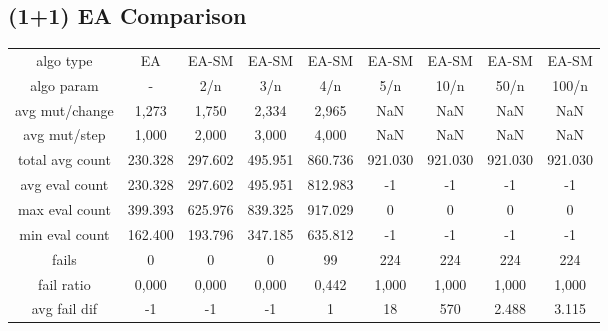 \subsection{(1+1) EA Comparison}

\begin{tabular}[h]{ccccccccc}
algo type&             EA&   EA-SM&   EA-SM&   EA-SM&   EA-SM&   EA-SM&   EA-SM&   EA-SM\\
algo param&             -&     2/n&     3/n&     4/n&     5/n&    10/n&    50/n&   100/n\\
avg mut/change&     1,273&   1,750&   2,334&   2,965&     NaN&     NaN&     NaN&     NaN\\
avg mut/step&       1,000&   2,000&   3,000&   4,000&     NaN&     NaN&     NaN&     NaN\\
\hline
total avg count&  230.328& 297.602& 495.951& 860.736& 921.030& 921.030& 921.030& 921.030\\
avg eval count&   230.328& 297.602& 495.951& 812.983&      -1&      -1&      -1&      -1\\
max eval count&   399.393& 625.976& 839.325& 917.029&       0&       0&       0&       0\\
min eval count&   162.400& 193.796& 347.185& 635.812&      -1&      -1&      -1&      -1\\
\hline
fails&                  0&       0&       0&      99&     224&     224&     224&     224\\
fail ratio&         0,000&   0,000&   0,000&   0,442&   1,000&   1,000&   1,000&   1,000\\
avg fail dif&          -1&      -1&      -1&       1&      18&     570&   2.488&   3.115\\
\end{tabular}

